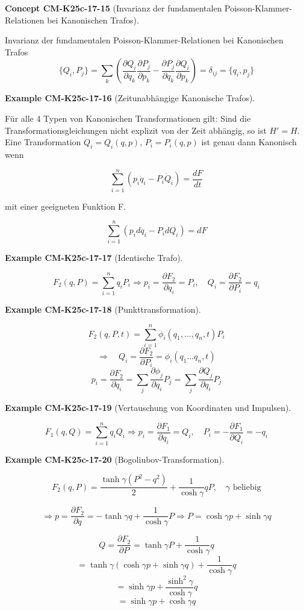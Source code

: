 \documentclass[10pt, letterpaper]{article}
\newcommand{\CustomHeading}[3]{%
  \par\medskip\noindent%
  \textbf{#1 #2} \textnormal{(#3)}.\enskip%
}
\newenvironment{EXA}[2]{\CustomHeading{Example}{#1}{#2}}{}
\newenvironment{CONC}[2]{\CustomHeading{Concept}{#1}{#2}}{}
\begin{document}
\begin{CONC}{CM-K25c-17-15}{Invarianz der fundamentalen Poisson-Klammer-Relationen bei Kanonischen Trafos}
Invarianz der fundamentalen Poisson-Klammer-Relationen bei Kanonischen Trafos
\[
\{Q_i, P_j\} = \sum_k \left(\frac{\partial Q_i}{\partial q_k}\frac{\partial P_j}{\partial p_k} - \frac{\partial P_j}{\partial q_k}\frac{\partial Q_i}{\partial p_k}\right) = \delta_{ij} = \{q_i, p_j\}
\]
\end{CONC}

\begin{EXA}{CM-K25c-17-16}{Zeitunabhängige Kanonische Trafos}
Für alle 4 Typen von Kanonischen Transformationen gilt:
Sind die Transformationsgleichungen nicht explizit von der Zeit abhängig, so ist $H' = H$. Eine Transformation $Q_i = Q_i(q,p)$, $P_i = P_i(q,p)$ ist genau dann Kanonisch wenn

\[\sum_{i=1}^n (p_i\dot{q}_i - P_i\dot{Q}_i) = \frac{dF}{dt}\]

mit einer geeigneten Funktion F.

\[\sum_{i=1}^n (p_idq_i - P_idQ_i) = dF\]
\end{EXA}

\begin{EXA}{CM-K25c-17-17}{Identische Trafo}
\[F_2(q,P) = \sum_{i=1}^n q_iP_i \Rightarrow p_i = \frac{\partial F_2}{\partial q_i} = P_i, \quad Q_i = \frac{\partial F_2}{\partial P_i} = q_i\]
\end{EXA}

\begin{EXA}{CM-K25c-17-18}{Punkttransformation}
\[F_2(q,P,t) = \sum_{i=1}^n \phi_i(q_1,...,q_n,t)P_i\]
\[\Rightarrow \quad Q_i = \frac{\partial F_2}{\partial P_i} = \phi_i(q_1...q_n,t)\]
\[p_i = \frac{\partial F_2}{\partial q_i} = \sum_j \frac{\partial \phi_j}{\partial q_i}P_j = \sum_j \frac{\partial Q_j}{\partial q_i}P_j\]
\end{EXA}

\begin{EXA}{CM-K25c-17-19}{Vertauschung von Koordinaten und Impulsen}
\[F_1(q,Q) = \sum_{i=1}^n q_iQ_i \Rightarrow p_i = \frac{\partial F_1}{\partial q_i} = Q_i, \quad P_i = -\frac{\partial F_1}{\partial Q_i} = -q_i\]
\end{EXA}

\begin{EXA}{CM-K25c-17-20}{Bogoliubov-Transformation}
\[F_2(q,P) = \frac{\tanh\gamma(P^2-q^2)}{2} + \frac{1}{\cosh\gamma}qP, \quad \gamma \text{ beliebig}\]

\[\Rightarrow p = \frac{\partial F_2}{\partial q} = -\tanh\gamma q + \frac{1}{\cosh\gamma}P \Rightarrow P = \cosh\gamma p + \sinh\gamma q\]

\[Q = \frac{\partial F_2}{\partial P} = \tanh\gamma P + \frac{1}{\cosh\gamma}q\]
\[= \tanh\gamma(\cosh\gamma p + \sinh\gamma q) + \frac{1}{\cosh\gamma}q\]
\[= \sinh\gamma p + \frac{\sinh^2\gamma}{\cosh\gamma}q\]
\[= \sinh\gamma p + \cosh\gamma q\]
\end{EXA}
\end{document}
